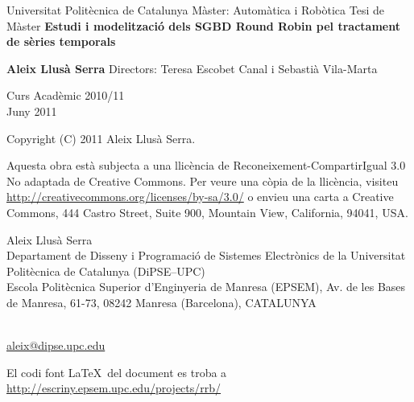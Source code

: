 






%



\begin{titlepage}
\begin{center}
{\Large \sc Universitat Polit\`{e}cnica de Catalunya} \vskip 1cm
{M\`{a}ster:} \vskip 0.5cm {\sc Autom\`{a}tica i Rob\`{o}tica} \vskip 4cm {Tesi
de M\`{a}ster} \vskip 1cm {\Large \bf \sc  Estudi i modelització
    dels SGBD
    Round Robin pel tractament de sèries temporals}

\vskip 2cm {\bf Aleix Llusà Serra} \vskip 4cm { Directors:
   Teresa Escobet Canal i 
    Sebastià Vila-Marta}

\vskip 1cm {\large Curs Acad\`{e}mic 2010/11}\\
\vfill {Juny 2011}
\end{center}
\end{titlepage}

{
  \thispagestyle{empty}

  \mbox{}

  \vfill

  \cc\bysa

  {\small
  Copyright (C) 2011 Aleix Llusà Serra.
  

  {\footnotesize
    Aquesta obra està subjecta a una llicència de Reconeixement-CompartirIgual 3.0 No adaptada de Creative Commons. Per veure una còpia de la llicència, visiteu \url{http://creativecommons.org/licenses/by-sa/3.0/} o envieu una carta a Creative Commons, 444 Castro Street, Suite 900, Mountain View, California, 94041, USA.
  }


    Aleix Llusà Serra\\
    Departament de Disseny i Programació de Sistemes Electrònics
      de la Universitat Politècnica de Catalunya (DiPSE--UPC)\\
    Escola Politècnica Superior d'Enginyeria de Manresa (EPSEM),
    Av. de les Bases de Manresa, 61-73,
    08242 Manresa (Barcelona),
    CATALUNYA 
    }\\
    \url{aleix@dipse.upc.edu}

    {\footnotesize
      El codi font \LaTeX\ del document es troba a 
      \url{http://escriny.epsem.upc.edu/projects/rrb/}
    }
}

%



